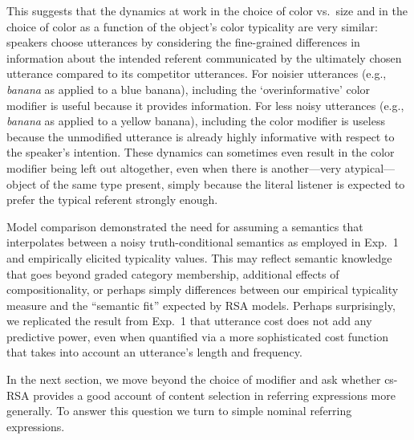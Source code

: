 \documentclass[11pt]{article}
\newcommand{\jd}[1]{\textcolor{Red}{[jd: #1]}}
\newcommand{\ndg}[1]{\textcolor{Green}{[ndg: #1]}}
\begin{document}
This suggests that the dynamics at work in the choice of color vs.~size and in the choice of color as a function of the object's color typicality are very similar: speakers choose utterances by considering the fine-grained differences in information about the intended referent communicated by the ultimately chosen utterance compared to its competitor utterances. For noisier utterances (e.g., \emph{banana} as applied to a blue banana), including the `overinformative' color modifier is useful because it provides information. For less noisy utterances (e.g., \emph{banana} as applied to a yellow banana), including the color modifier is useless because the unmodified utterance is already highly informative with respect to the speaker's intention. These dynamics can sometimes even result in the color modifier being left out altogether, even when there is another---very atypical---object of the same type present, simply because the literal listener is expected to prefer the typical referent strongly enough.

Model comparison demonstrated the need for assuming a semantics that interpolates between a noisy truth-conditional semantics as employed in Exp.~1 and empirically elicited typicality values. 
This may reflect semantic knowledge that goes beyond graded category membership, additional effects of compositionality, or perhaps simply differences between our empirical typicality measure and the ``semantic fit'' expected by RSA models.
Perhaps surprisingly, we replicated the result from Exp.~1 that utterance cost does not add any predictive power, even when quantified via a more sophisticated cost function that takes into account an utterance's length and frequency.

In the next section, we move beyond the choice of modifier and ask whether cs-RSA provides a good account of content selection in referring expressions more generally. To answer this question we turn to simple nominal referring expressions.
\end{document}
